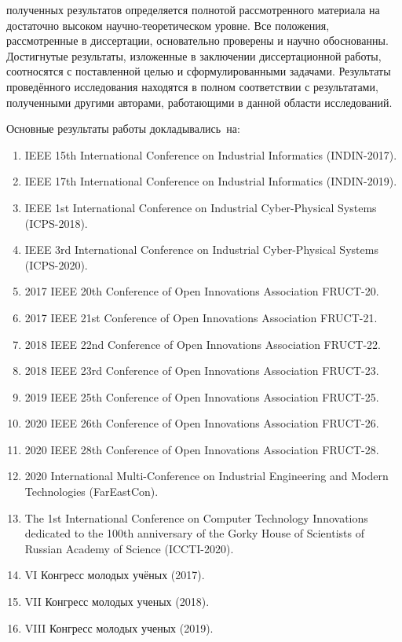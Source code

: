{\reliability} полученных результатов определяется полнотой рассмотренного материала на достаточно высоком научно-теоретическом уровне. Все положения,  рассмотренные в диссертации, основательно проверены и научно обоснованны. Достигнутые результаты, изложенные в заключении диссертационной работы, соотносятся с поставленной целью и сформулированными задачами. Результаты проведённого исследования находятся в полном соответствии с результатами, полученными другими авторами, работающими в данной области исследований.


{\probation}
Основные результаты работы докладывались~на:
\begin{enumerate}[beginpenalty=10000]
	\item IEEE 15th International Conference on Industrial Informatics (INDIN-2017).
	\item IEEE 17th International Conference on Industrial Informatics (INDIN-2019).
	\item IEEE 1st International Conference on Industrial Cyber-Physical Systems (ICPS-2018).
	\item IEEE 3rd International Conference on Industrial Cyber-Physical Systems (ICPS-2020).
	\item 2017 IEEE 20th Conference of Open Innovations Association {FRUCT-20}.
	\item 2017 IEEE 21st Conference of Open Innovations Association {FRUCT-21}.
	\item 2018 IEEE 22nd Conference of Open Innovations Association {FRUCT-22}.
	\item 2018 IEEE 23rd Conference of Open Innovations Association {FRUCT-23}.
	\item 2019 IEEE 25th Conference of Open Innovations Association {FRUCT-25}.
	\item 2020 IEEE 26th Conference of Open Innovations Association {FRUCT-26}.
	\item 2020 IEEE 28th Conference of Open Innovations Association {FRUCT-28}.
	\item 2020 International Multi-Conference on Industrial Engineering and Modern Technologies (FarEastCon).
	\item The 1st International Conference on Computer Technology Innovations dedicated to the 100th anniversary of the Gorky House of Scientists of Russian Academy of Science (ICCTI-2020).
	\item VI Конгресс молодых учёных (2017).
	\item VII Конгресс молодых ученых (2018).
	\item VIII Конгресс молодых ученых (2019).

\end{enumerate}

